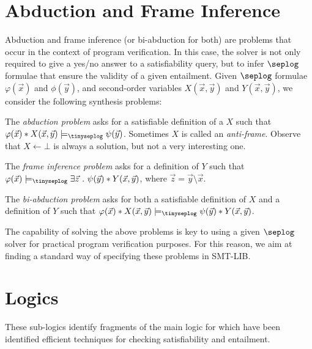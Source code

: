 \documentclass[10pt]{llncs}
\begin{document}
\section{Abduction and Frame Inference}

Abduction and frame inference (or bi-abduction for both) are problems
that occur in the context of program verification. In this case, the
solver is not only required to give a yes/no answer to a
satisfiability query, but to infer $\seplog$ formulae that ensure the
validity of a given entailment. Given $\seplog$ formulae
$\varphi(\vec{x})$ and $\phi(\vec{y})$, and second-order variables
$X(\vec{x},\vec{y})$ and $Y(\vec{x},\vec{y})$, we consider the
following synthesis problems:

\begin{compactenum}
\item The \emph{abduction problem} asks for a satisfiable definition
  of a $X$ such that $\varphi(\vec{x}) * X(\vec{x},\vec{y})
  \models_{\tinyseplog} \psi(\vec{y})$. Sometimes $X$ is called an
  \emph{anti-frame}. Observe that $X \leftarrow \bot$ is always a
  solution, but not a very interesting one.
%
\item The \emph{frame inference problem} asks for a definition of $Y$
  such that $\varphi(\vec{x}) \models_{\tinyseplog} \exists \vec{z}
  ~.~ \psi(\vec{y}) * Y(\vec{x},\vec{y})$, where $\vec{z} = \vec{y}
  \setminus \vec{x}$.
%
\item The \emph{bi-abduction problem} asks for both a satisfiable
  definition of $X$ and a definition of $Y$ such that
  $\varphi(\vec{x}) * X(\vec{x},\vec{y}) \models_{\tinyseplog}
  \psi(\vec{y}) * Y(\vec{x},\vec{y})$.
\end{compactenum}
The capability of solving the above problems is key to using a given
$\seplog$ solver for practical program verification purposes. For this
reason, we aim at finding a standard way of specifying these problems
in SMT-LIB.


\section{Logics}
\label{sec:frag}

These sub-logics identify fragments of
the main logic for which have been identified efficient techniques 
for checking satisfiability and entailment.
\end{document}
